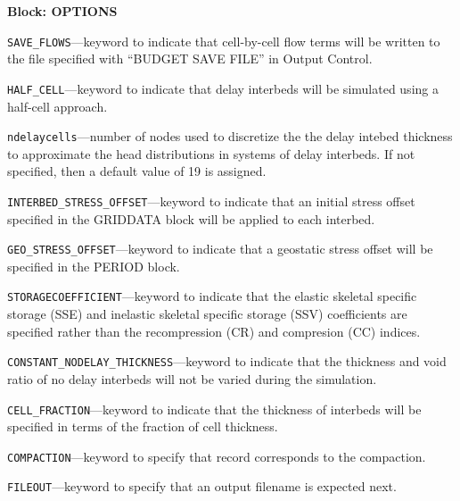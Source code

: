
\item \textbf{Block: OPTIONS}

\begin{description}
\item \texttt{SAVE\_FLOWS}---keyword to indicate that cell-by-cell flow terms will be written to the file specified with ``BUDGET SAVE FILE'' in Output Control.

\item \texttt{HALF\_CELL}---keyword to indicate that delay interbeds will be simulated using a half-cell approach.

\item \texttt{ndelaycells}---number of nodes used to discretize the the delay intebed thickness to approximate the head distributions in systems of delay interbeds. If not specified, then a default value of 19 is assigned.

\item \texttt{INTERBED\_STRESS\_OFFSET}---keyword to indicate that an initial stress offset specified in the GRIDDATA block will be applied to each interbed.

\item \texttt{GEO\_STRESS\_OFFSET}---keyword to indicate that a geostatic stress offset will be specified in the PERIOD block.

\item \texttt{STORAGECOEFFICIENT}---keyword to indicate that the elastic skeletal specific storage (SSE) and inelastic skeletal specific storage (SSV) coefficients are specified rather than the recompression (CR) and compresion (CC) indices.

\item \texttt{CONSTANT\_NODELAY\_THICKNESS}---keyword to indicate that the thickness and void ratio of no delay interbeds will not be varied during the simulation.

\item \texttt{CELL\_FRACTION}---keyword to indicate that the thickness of interbeds will be specified in terms of the fraction of cell thickness.

\item \texttt{COMPACTION}---keyword to specify that record corresponds to the compaction.

\item \texttt{FILEOUT}---keyword to specify that an output filename is expected next.


\end{description}
